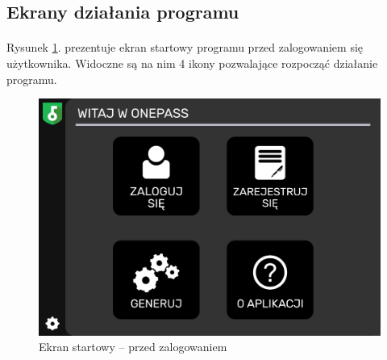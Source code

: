 \documentclass[a4paper]{article}
\begin{document}
\newpage

\subsection{Ekrany działania programu}
\paragraph{}Rysunek \ref{fig:startPrzed}. prezentuje ekran startowy programu przed zalogowaniem się użytkownika. Widoczne są na nim 4 ikony pozwalające rozpocząć działanie programu.
\begin{figure}[H]
    \centering
    \includegraphics[width=1\textwidth]{img/ekran_przed_zalogowaniem.png}
    \caption{Ekran startowy -- przed zalogowaniem}
    \label{fig:startPrzed}
\end{figure}

\newpage
\end{document}
